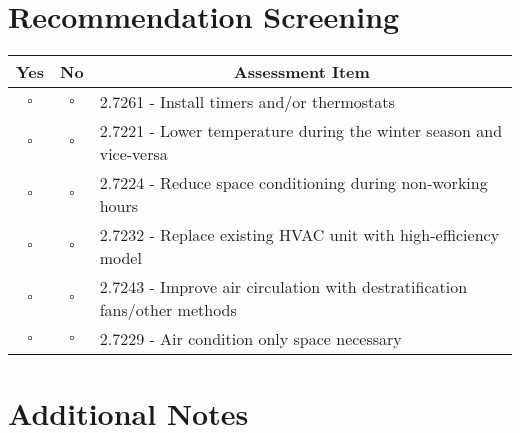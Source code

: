 \documentclass[./main.tex]{subfiles}
\begin{document}
\vspace{\answerspace}

\section*{Recommendation Screening}

\begin{tabular}{|c|c|p{13.5cm}|}
\hline
\multicolumn{1}{|c|}{\textbf{Yes}} & \multicolumn{1}{c|}{\textbf{No}} & \multicolumn{1}{c|}{\textbf{Assessment Item}} \\
\hline
$\square$ & $\square$ & 2.7261 - Install timers and/or thermostats \\
\hline
$\square$ & $\square$ & 2.7221 - Lower temperature during the winter season and vice-versa \\
\hline
$\square$ & $\square$ & 2.7224 - Reduce space conditioning during non-working hours \\
\hline
$\square$ & $\square$ & 2.7232 - Replace existing HVAC unit with high-efficiency model \\
\hline
$\square$ & $\square$ & 2.7243 - Improve air circulation with destratification fans/other methods \\
\hline
$\square$ & $\square$ & 2.7229 - Air condition only space necessary \\
\hline
\end{tabular}

\section*{Additional Notes}


\end{document}

